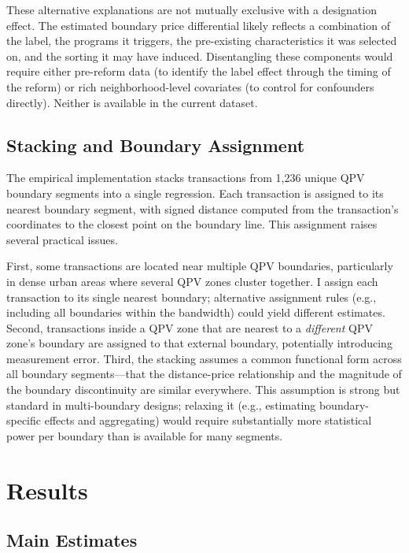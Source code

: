 \documentclass[12pt]{article}
\begin{document}
These alternative explanations are not mutually exclusive with a designation effect. The estimated boundary price differential likely reflects a combination of the label, the programs it triggers, the pre-existing characteristics it was selected on, and the sorting it may have induced. Disentangling these components would require either pre-reform data (to identify the label effect through the timing of the reform) or rich neighborhood-level covariates (to control for confounders directly). Neither is available in the current dataset.

\subsection{Stacking and Boundary Assignment}

The empirical implementation stacks transactions from 1,236 unique QPV boundary segments into a single regression. Each transaction is assigned to its nearest boundary segment, with signed distance computed from the transaction's coordinates to the closest point on the boundary line. This assignment raises several practical issues.

First, some transactions are located near multiple QPV boundaries, particularly in dense urban areas where several QPV zones cluster together. I assign each transaction to its single nearest boundary; alternative assignment rules (e.g., including all boundaries within the bandwidth) could yield different estimates. Second, transactions inside a QPV zone that are nearest to a \textit{different} QPV zone's boundary are assigned to that external boundary, potentially introducing measurement error. Third, the stacking assumes a common functional form across all boundary segments---that the distance-price relationship and the magnitude of the boundary discontinuity are similar everywhere. This assumption is strong but standard in multi-boundary designs; relaxing it (e.g., estimating boundary-specific effects and aggregating) would require substantially more statistical power per boundary than is available for many segments.


\section{Results} \label{sec:results}

\subsection{Main Estimates}
\end{document}
